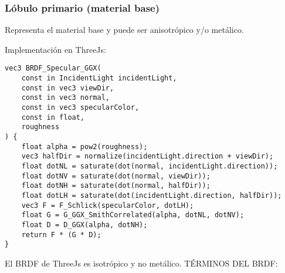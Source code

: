         \subsubsection{L\'obulo primario (material base)}
            Representa el material base y puede ser anisotr\'opico y/o  met\'alico.

            Implementaci\'on en ThreeJs:
            \singlespacing
            \begin{lstlisting}[caption=My Javascript Example]
vec3 BRDF_Specular_GGX(
    const in IncidentLight incidentLight,
    const in vec3 viewDir,
    const in vec3 normal,
    const in vec3 specularColor,
    const in float,
    roughness
) {
    float alpha = pow2(roughness);
    vec3 halfDir = normalize(incidentLight.direction + viewDir);
    float dotNL = saturate(dot(normal, incidentLight.direction));
    float dotNV = saturate(dot(normal, viewDir));
    float dotNH = saturate(dot(normal, halfDir));
    float dotLH = saturate(dot(incidentLight.direction, halfDir));
    vec3 F = F_Schlick(specularColor, dotLH);
    float G = G_GGX_SmithCorrelated(alpha, dotNL, dotNV);
    float D = D_GGX(alpha, dotNH);
    return F * (G * D);
}
            \end{lstlisting}
            \singlespacing
            El BRDF de ThreeJs es isotrópico y no metálico.
            \singlespacing
            T\'ERMINOS DEL BRDF:
            \singlespacing
